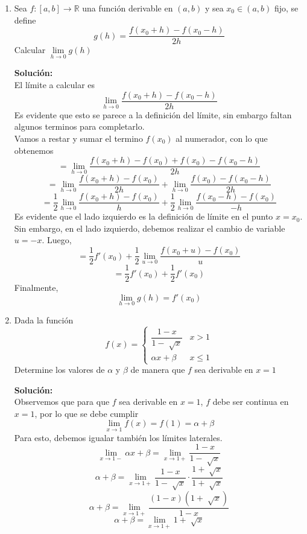 \documentclass[12pt]{article}
\newenvironment{solucion}
{\begin{mdframed}[backgroundcolor=black!10]
		{\bf Solución:}\\
	}
	{
	\end{mdframed}
}
\newenvironment{preguntas}
{\begin{enumerate}\itemsep12pt
	}
	{
	\end{enumerate}
}
\newcommand{\ra}{\rightarrow}
\newcommand{\R}{\mathbb{R}}
\begin{document}
\begin{preguntas}
\begin{solucion}
\begin{enumerate}[a)]
\item 
\item 
\end{enumerate}
\end{solucion}
\item Sea $f:[a,b] \ra \R$ una función derivable en $(a,b)$ y sea $x_0 \in (a,b)$ fijo, se define
$$ g(h) = \dfrac{f(x_0 + h) - f(x_0-h)}{2h}$$
Calcular $\lim\limits_{h \ra 0} g(h)$
\begin{solucion}
El límite a calcular es
$$ \lim\limits_{h \ra 0} \dfrac{f(x_0 + h) - f(x_0-h)}{2h}$$
Es evidente que esto se parece a la definición del límite, sin embargo faltan algunos terminos para completarlo.\\
Vamos a restar y sumar el termino $f(x_0)$ al numerador, con lo que obtenemos
$$= \lim\limits_{h \ra 0} \dfrac{f(x_0 + h) - f(x_0) + f(x_0) - f(x_0-h)}{2h}$$
$$= \lim\limits_{h \ra 0} \dfrac{f(x_0 + h) - f(x_0)}{2h} + \lim\limits_{h \ra 0} \dfrac{f(x_0) - f(x_0-h)}{2h}$$
$$= \dfrac{1}{2}\lim\limits_{h \ra 0} \dfrac{f(x_0 + h) - f(x_0)}{h} + \dfrac{1}{2}\lim\limits_{h \ra 0} \dfrac{f(x_0-h) - f(x_0)}{-h}$$
Es evidente que el lado izquierdo es la definición de límite en el punto $x=x_0$. Sin embargo, en el lado izquierdo, debemos realizar el cambio de variable $u = -x$. Luego,
$$= \dfrac{1}{2}f'(x_0) + \dfrac{1}{2}\lim\limits_{u \ra 0} \dfrac{f(x_0+u) - f(x_0)}{u}$$
$$= \dfrac{1}{2}f'(x_0) + \dfrac{1}{2}f'(x_0)$$
Finalmente,
$$\lim\limits_{h \ra 0} g(h) = f'(x_0)$$
\end{solucion}
\item Dada la función
$$f(x) = \begin{cases}
\dfrac{1-x}{1-\sqrt[]{x}} & x > 1\\
\alpha x + \beta & x \leq 1
\end{cases}$$
Determine los valores de $\alpha$ y $\beta$ de manera que $f$ sea derivable en $x=1$
\begin{solucion}
Observemos que para que $f$ sea derivable en $x=1$, $f$ debe ser continua en $x=1$, por lo que se debe cumplir
$$\lim\limits_{x\ra 1}f(x) = f(1) = \alpha  + \beta$$
Para esto, debemos igualar también los límites laterales.
$$\lim\limits_{x\ra 1-} \alpha x + \beta = \lim\limits_{x\ra 1+} \dfrac{1-x}{1-\sqrt[]{x}} $$
$$\alpha + \beta = \lim\limits_{x\ra 1+} \dfrac{1-x}{1-\sqrt[]{x}} \cdot \dfrac{1+\sqrt[]{x}}{1+\sqrt[]{x}} $$
$$\alpha + \beta = \lim\limits_{x\ra 1+} \dfrac{(1-x)(1+\sqrt[]{x})}{1-x}$$
$$\alpha + \beta = \lim\limits_{x\ra 1+} 1+\sqrt[]{x}$$

\end{solucion}
\end{preguntas}
\end{document}
